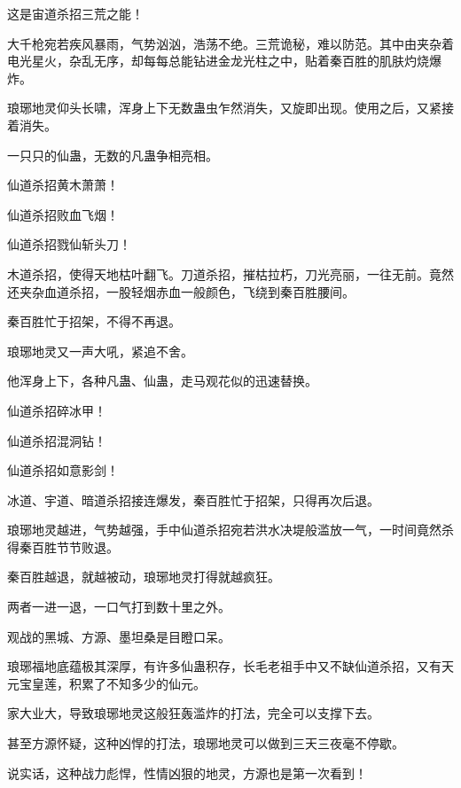 \begin{this_body}
这是宙道杀招三荒之能！

大千枪宛若疾风暴雨，气势汹汹，浩荡不绝。三荒诡秘，难以防范。其中由夹杂着电光星火，杂乱无序，却每每总能钻进金龙光柱之中，贴着秦百胜的肌肤灼烧爆炸。

琅琊地灵仰头长啸，浑身上下无数蛊虫乍然消失，又旋即出现。使用之后，又紧接着消失。

一只只的仙蛊，无数的凡蛊争相亮相。

仙道杀招黄木萧萧！

仙道杀招败血飞烟！

仙道杀招戮仙斩头刀！

木道杀招，使得天地枯叶翻飞。刀道杀招，摧枯拉朽，刀光亮丽，一往无前。竟然还夹杂血道杀招，一股轻烟赤血一般颜色，飞绕到秦百胜腰间。

秦百胜忙于招架，不得不再退。

琅琊地灵又一声大吼，紧追不舍。

他浑身上下，各种凡蛊、仙蛊，走马观花似的迅速替换。

仙道杀招碎冰甲！

仙道杀招混洞钻！

仙道杀招如意影剑！

冰道、宇道、暗道杀招接连爆发，秦百胜忙于招架，只得再次后退。

琅琊地灵越进，气势越强，手中仙道杀招宛若洪水决堤般滥放一气，一时间竟然杀得秦百胜节节败退。

秦百胜越退，就越被动，琅琊地灵打得就越疯狂。

两者一进一退，一口气打到数十里之外。

观战的黑城、方源、墨坦桑是目瞪口呆。

琅琊福地底蕴极其深厚，有许多仙蛊积存，长毛老祖手中又不缺仙道杀招，又有天元宝皇莲，积累了不知多少的仙元。

家大业大，导致琅琊地灵这般狂轰滥炸的打法，完全可以支撑下去。

甚至方源怀疑，这种凶悍的打法，琅琊地灵可以做到三天三夜毫不停歇。

说实话，这种战力彪悍，性情凶狠的地灵，方源也是第一次看到！

\end{this_body}

